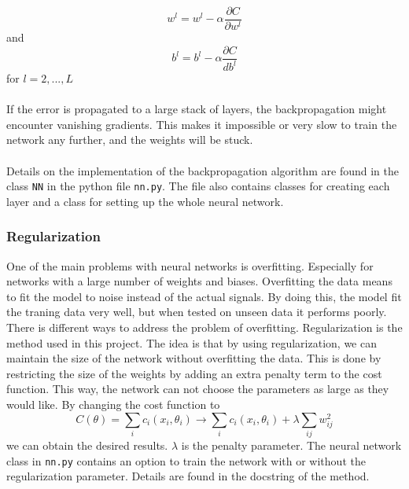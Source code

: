 \begin{equation}
w^l = w^l - \alpha \frac{\partial C}{\partial w^l}
\end{equation}
and 
\begin{equation}
    b^l = b^l - \alpha \frac{\partial C}{db^l}
\end{equation}
for $l = 2,..., L$
\\
\\
If the error is propagated to a large stack of layers, the backpropagation might encounter vanishing gradients. This makes it impossible or very slow to train the network any further, and the weights will be stuck. 
\\
\\
Details on the implementation of the backpropagation algorithm are found in the class \lstinline{NN} in the python file \lstinline{nn.py}. The file also contains classes for creating each layer and a class for setting up the whole neural network. 
\subsubsection{Regularization}
One of the main problems with neural networks is overfitting.\cite{Hands-On} Especially for networks with a large number of weights and biases. Overfitting the data means to fit the model to noise instead of the actual signals. By doing this, the model fit the traning data very well, but when tested on unseen data it performs poorly. There is different ways to address the problem of overfitting. Regularization is the method used in this project. The idea is that by using regularization, we can maintain the size of the network without overfitting the data.  This is done by restricting the size of the weights by adding an extra penalty term to the cost function. \cite{Hands-On} This way, the network can not choose the parameters as large as they would like. By changing the cost function to 
\begin{equation}
 C(\theta) = \sum_i c_i(x_i, \theta_i) \to \sum_i c_i(x_i, \theta_i) + \lambda \sum_{ij} w_{ij}^2   
\end{equation}
we can obtain the desired results. $\lambda$ is the penalty parameter. The neural network class in \lstinline{nn.py} contains an option to train the network with or without the regularization parameter. Details are found in the docstring of the method. 

